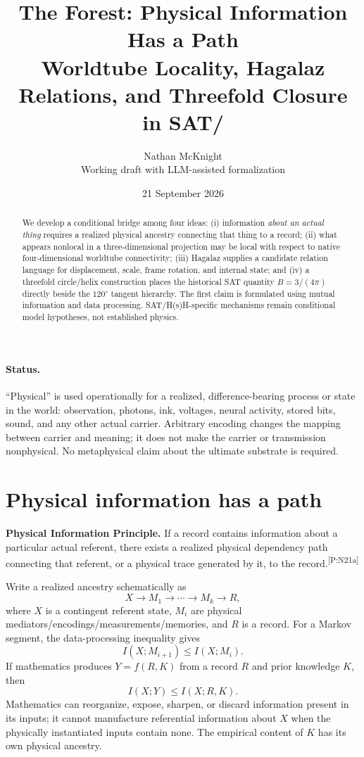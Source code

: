 \documentclass[11pt]{article}
\title{\textbf{The Forest: Physical Information Has a Path}\\[0.3em]\large Worldtube Locality, Hagalaz Relations, and Threefold Closure in SAT/\HsH}
\author{Nathan McKnight\\\small Working draft with LLM-assisted formalization}
\date{21 September 2026}
\newcommand{\HsH}{H(s)H\xspace}
\newcommand{\mcite}[1]{\textsuperscript{\tiny\textsf{[#1]}}}
\begin{document}
\maketitle

\begin{abstract}
We develop a conditional bridge among four ideas: (i) information \emph{about an actual thing} requires a realized physical ancestry connecting that thing to a record; (ii) what appears nonlocal in a three-dimensional projection may be local with respect to native four-dimensional worldtube connectivity; (iii) Hagalaz supplies a candidate relation language for displacement, scale, frame rotation, and internal state; and (iv) a threefold circle/helix construction places the historical SAT quantity $B=3/(4\pi)$ directly beside the $120^\circ$ tangent hierarchy. The first claim is formulated using mutual information and data processing. SAT/\HsH-specific mechanisms remain conditional model hypotheses, not established physics.
\end{abstract}

\paragraph{Status.}
``Physical'' is used operationally for a realized, difference-bearing process or state in the world: observation, photons, ink, voltages, neural activity, stored bits, sound, and any other actual carrier. Arbitrary encoding changes the mapping between carrier and meaning; it does not make the carrier or transmission nonphysical. No metaphysical claim about the ultimate substrate is required.

\section{Physical information has a path}

\textbf{Physical Information Principle.} If a record contains information about a particular actual referent, there exists a realized physical dependency path connecting that referent, or a physical trace generated by it, to the record.\mcite{P:N21a}

Write a realized ancestry schematically as
\begin{equation}
X\longrightarrow M_1\longrightarrow\cdots\longrightarrow M_k\longrightarrow R,
\end{equation}
where $X$ is a contingent referent state, $M_i$ are physical mediators/encodings/measurements/memories, and $R$ is a record. For a Markov segment, the data-processing inequality gives
\begin{equation}
I(X;M_{i+1})\le I(X;M_i).
\end{equation}
If mathematics produces $Y=f(R,K)$ from a record $R$ and prior knowledge $K$, then
\begin{equation}
I(X;Y)\le I(X;R,K).
\end{equation}
Mathematics can reorganize, expose, sharpen, or discard information present in its inputs; it cannot manufacture referential information about $X$ when the physically instantiated inputs contain none. The empirical content of $K$ has its own physical ancestry.
\end{document}
